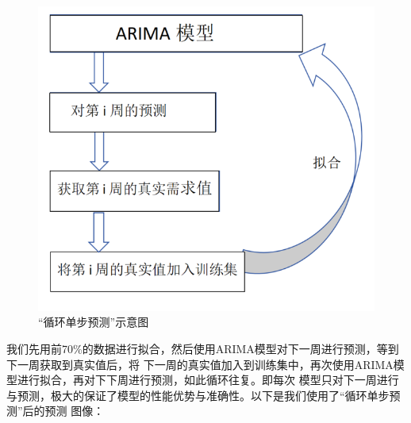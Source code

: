 \documentclass{cumcmthesis}
\begin{document}
        \fi %

        \begin{figure}[ht!]
            \centering
            \includegraphics[scale=0.7]{graph/graph_3.png}
            \caption{“循环单步预测”示意图}
            \label{fig:3}
        \end{figure}
        \FloatBarrier    %

        我们先用前70\%的数据进行拟合，然后使用ARIMA模型对下一周进行预测，等到下一周获取到真实值后，将
        下一周的真实值加入到训练集中，再次使用ARIMA模型进行拟合，再对下下周进行预测，如此循环往复。即每次
        模型只对下一周进行与预测，极大的保证了模型的性能优势与准确性。以下是我们使用了“循环单步预测”后的预测
        图像：\\
\end{document}
